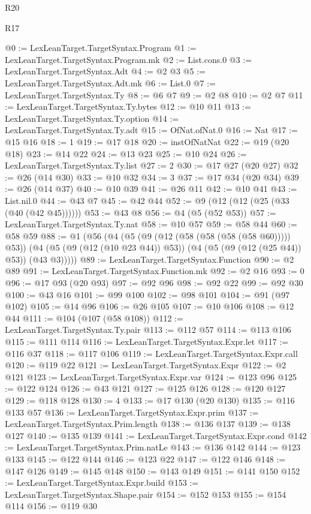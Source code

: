 \begin{lexlean}{R20}
\begin{lexlean}{R17}
\begin{coremodule}
{{{{{{{{{{{{{{{{{{{{{{{{{{{{{{{{{{{{{{{{{{{{{{{{{{{{{{{{{{{{{{{{{{{{{{{{{{{{{{{{{{{{{{{{{{{{{{{{{{{{{{{{{{{@0 := LexLeanTarget.TargetSyntax.Program
@1 := LexLeanTarget.TargetSyntax.Program.mk
@2 := List.cons.{0}
@3 := LexLeanTarget.TargetSyntax.Adt
@4 := @2 @3
@5 := LexLeanTarget.TargetSyntax.Adt.mk
@6 := List.{0}
@7 := LexLeanTarget.TargetSyntax.Ty
@8 := @6 @7
@9 := @2 @8
@10 := @2 @7
@11 := LexLeanTarget.TargetSyntax.Ty.bytes
@12 := @10 @11
@13 := LexLeanTarget.TargetSyntax.Ty.option
@14 := LexLeanTarget.TargetSyntax.Ty.adt
@15 := OfNat.ofNat.{0}
@16 := Nat
@17 := @15 @16
@18 := 1
@19 := @17 @18
@20 := instOfNatNat
@22 := @19 (@20 @18)
@23 := @14 @22
@24 := @13 @23
@25 := @10 @24
@26 := LexLeanTarget.TargetSyntax.Ty.list
@27 := 2
@30 := @17 @27 (@20 @27)
@32 := @26 (@14 @30)
@33 := @10 @32
@34 := 3
@37 := @17 @34 (@20 @34)
@39 := @26 (@14 @37)
@40 := @10 @39
@41 := @26 @11
@42 := @10 @41
@43 := List.nil.{0}
@44 := @43 @7
@45 := @42 @44
@52 := @9 (@12 (@12 (@25 (@33 (@40 (@42 @45))))))
@53 := @43 @8
@56 := @4 (@5 (@52 @53))
@57 := LexLeanTarget.TargetSyntax.Ty.nat
@58 := @10 @57
@59 := @58 @44
@60 := @58 @59
@88 := @1
    (@56
      (@4
        (@5 (@9 (@12 (@58 (@58 (@58 (@58 @60))))) @53))
        (@4 (@5 (@9 (@12 (@10 @23 @44)) @53)) (@4 (@5 (@9 (@12 (@25 @44)) @53)) (@43 @3)))))
@89 := LexLeanTarget.TargetSyntax.Function
@90 := @2 @89
@91 := LexLeanTarget.TargetSyntax.Function.mk
@92 := @2 @16
@93 := 0
@96 := @17 @93 (@20 @93)
@97 := @92 @96
@98 := @92 @22
@99 := @92 @30
@100 := @43 @16
@101 := @99 @100
@102 := @98 @101
@104 := @91 (@97 @102)
@105 := @14 @96
@106 := @26 @105
@107 := @10 @106
@108 := @12 @44
@111 := @104 (@107 (@58 @108))
@112 := LexLeanTarget.TargetSyntax.Ty.pair
@113 := @112 @57
@114 := @113 @106
@115 := @111 @114
@116 := LexLeanTarget.TargetSyntax.Expr.let
@117 := @116 @37
@118 := @117 @106
@119 := LexLeanTarget.TargetSyntax.Expr.call
@120 := @119 @22
@121 := LexLeanTarget.TargetSyntax.Expr
@122 := @2 @121
@123 := LexLeanTarget.TargetSyntax.Expr.var
@124 := @123 @96
@125 := @122 @124
@126 := @43 @121
@127 := @125 @126
@128 := @120 @127
@129 := @118 @128
@130 := 4
@133 := @17 @130 (@20 @130)
@135 := @116 @133 @57
@136 := LexLeanTarget.TargetSyntax.Expr.prim
@137 := LexLeanTarget.TargetSyntax.Prim.length
@138 := @136 @137
@139 := @138 @127
@140 := @135 @139
@141 := LexLeanTarget.TargetSyntax.Expr.cond
@142 := LexLeanTarget.TargetSyntax.Prim.natLe
@143 := @136 @142
@144 := @123 @133
@145 := @122 @144
@146 := @123 @22
@147 := @122 @146
@148 := @147 @126
@149 := @145 @148
@150 := @143 @149
@151 := @141 @150
@152 := LexLeanTarget.TargetSyntax.Expr.build
@153 := LexLeanTarget.TargetSyntax.Shape.pair
@154 := @152 @153
@155 := @154 @114
@156 := @119 @30
}}}}}}}}}}}}}}}}}}}}}}}}}}}}}}}}}}}}}}}}}}}}}}}}}}}}}}}}}}}}}}}}}}}}}}}}}}}}}}}}}}}}}}}}}}}}}}}}}}}}}}}}}}}
\end{coremodule}
\end{lexlean}
\end{lexlean}
